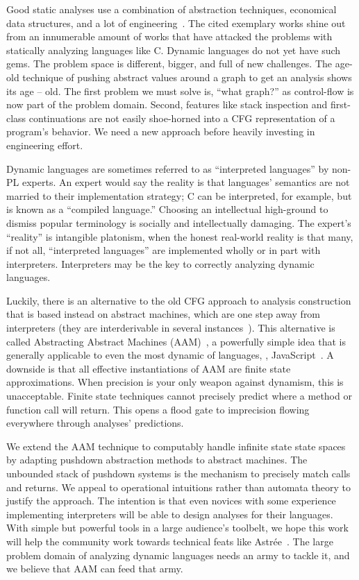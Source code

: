 Good static analyses use a combination of abstraction techniques, economical data structures, and a lot of engineering~\citep{ianjohnson:CousotEtAl-TASE07,ianjohnson:DBLP:journals/ipl/YiCKK07}.
%
The cited exemplary works shine out from an innumerable amount of works that have attacked the problems with statically analyzing languages like C.
%
Dynamic languages do not yet have such gems.
%
The problem space is different, bigger, and full of new challenges.
%
The age-old technique of pushing abstract values around a graph to get an analysis shows its age -- old.
%
The first problem we must solve is, ``what graph?'' as control-flow is now part of the problem domain.
%
Second, features like stack inspection and first-class continuations are not easily shoe-horned into a CFG representation of a program's behavior.
%
We need a new approach before heavily investing in engineering effort.

%
Dynamic languages are sometimes referred to as ``interpreted languages'' by non-PL experts.
%
An expert would say the reality is that languages' semantics are not married to their implementation strategy; C can be interpreted, for example, but is known as a ``compiled language.''
%
Choosing an intellectual high-ground to dismiss popular terminology is socially and intellectually damaging.
%
The expert's ``reality'' is intangible platonism, when the honest real-world reality is that many, if not all, ``interpreted languages'' are implemented wholly or in part with interpreters.
%
Interpreters may be the key to correctly analyzing dynamic languages.
%

%
Luckily, there is an alternative to the old CFG approach to analysis construction that is based instead on abstract machines, which are one step away from interpreters (they are interderivable in several instances~\citep{ianjohnson:DBLP:conf/icfp/Danvy08}).
%
This alternative is called Abstracting Abstract Machines (AAM)~\citep{dvanhorn:VanHorn2012Systematic}, a powerfully simple idea that is generally applicable to even the most dynamic of languages, \eg{}, JavaScript~\citep{ianjohnson:DBLP:journals/corr/KashyapDKWGSWH14}.
%
A downside is that all effective instantiations of AAM are finite state approximations.
%
When precision is your only weapon against dynamism, this is unacceptable.
%
Finite state techniques cannot precisely predict where a method or function call will return.
%
This opens a flood gate to imprecision flowing everywhere through analyses' predictions.
%

%
We extend the AAM technique to computably handle infinite state state spaces by adapting pushdown abstraction methods to abstract machines.
%
The unbounded stack of pushdown systems is the mechanism to precisely match calls and returns.
%
We appeal to operational intuitions rather than automata theory to justify the approach.
%
The intention is that even novices with some experience implementing interpreters will be able to design analyses for their languages.
%
With simple but powerful tools in a large audience's toolbelt, we hope this work will help the community work towards technical feats like Astr\'ee~\citep{ianjohnson:CousotEtAl-TASE07}.
%
The large problem domain of analyzing dynamic languages needs an army to tackle it, and we believe that AAM can feed that army.